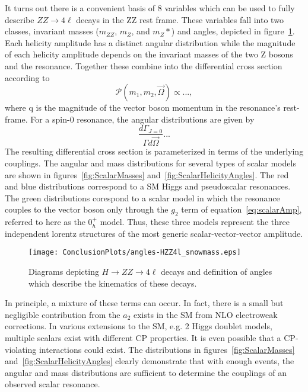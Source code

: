 It turns out there is a convenient basis of 8 variables which can be
used to fully describe $ZZ\to4\ell$ decays in the ZZ rest frame.  These
variables fall into two classes, invariant masses ($m_{ZZ}$, $m_Z$, and 
$m_Z*$) and angles, depicted in figure~\ref{fig:HZZdiagram}.
Each helicity amplitude has a distinct angular distribution while the
magnitude of each helicity amplitude depends on the invariant masses 
of the two Z bosons and the resonance.  Together these combine into the
differential cross section according to
\begin{equation}
\mathscr{P}(m_1,m_2,\vec{\Omega})\propto...,
\end{equation}
where q is the magnitude of the vector boson momentum in the resonance's rest-frame.
For a spin-0 resonance, the angular distributions are given 
by
\begin{equation}
\frac{d\Gamma_{J=0}}{\Gamma d\vec{\Omega}}... 
\end{equation}
The resulting differential cross section is parameterized in terms of 
the underlying couplings. 
The angular and mass distributions for several types of scalar 
models are shown in figures~\ref{fig:ScalarMasses} 
and~\ref{fig:ScalarHelicityAngles}.  The red and blue distributions
correspond to a SM Higgs and pseudoscalar resonances.  The green 
distributions corespond to a scalar model in which the resonance couples
to the vector boson only through the $g_2$ term of 
equation~\ref{eq:scalarAmp}, referred to here as
the $0_{h}^+$ model.  Thus, these three models 
represent the three independent lorentz structures of the most generic
scalar-vector-vector amplitude.  

\begin{figure}
\begin{center}
\texttt{[image: ConclusionPlots/angles-HZZ4l\_snowmass.eps]}
\caption{Diagrams depicting $H\to ZZ\to4\ell$ decays and definition
of angles which describe the kinematics of these decays.}
\label{fig:HZZdiagram}
\end{center}
\end{figure}

In principle,
a mixture of these terms can occur.  In fact, there is a small but 
negligible contribution from the $a_2$ exists in the SM from NLO 
electroweak corrections.  In various extensions to the SM, e.g. 
2 Higgs doublet models, multiple scalars exist with different CP properties.  
It is even possible that a CP-violating interactions could exist.  The 
distributions in figures~\ref{fig:ScalarMasses} 
and~\ref{fig:ScalarHelicityAngles} clearly demonstrate that with 
enough events, the angular and mass distributions are sufficient to 
determine the couplings of an observed scalar resonance.  

